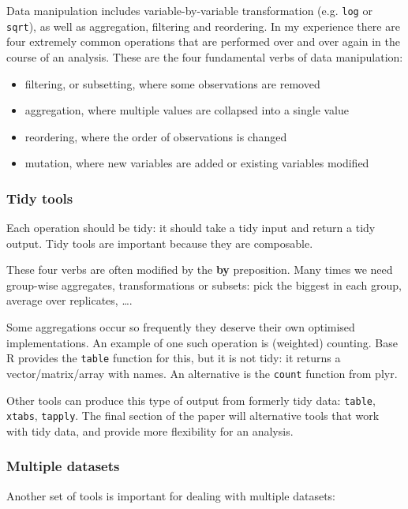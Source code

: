 \documentclass[oneside]{article}
\begin{document}
Data manipulation includes variable-by-variable transformation (e.g. {\tt log} or {\tt sqrt}), as well as aggregation, filtering and reordering. In my experience there are four extremely common operations that are performed over and over again in the course of an analysis. These are the four fundamental verbs of data manipulation:

\begin{itemize}

\item filtering, or subsetting, where some observations are removed
\item aggregation, where multiple values are collapsed into a single value
\item reordering, where the order of observations is changed
\item mutation, where new variables are added or existing variables modified 

\end{itemize}

\subsubsection{Tidy tools}

Each operation should be tidy: it should take a tidy input and return a tidy output. Tidy tools are important because they are composable.

These four verbs are often modified by the \textbf{by} preposition. Many times we need group-wise aggregates, transformations or subsets: pick the biggest in each group, average over replicates, \ldots.  

Some aggregations occur so frequently they deserve their own optimised implementations. An example of one such operation is (weighted) counting. Base R provides the {\tt table} function for this, but it is not tidy: it returns a vector/matrix/array with names. An alternative is the {\tt count} function from plyr.

Other tools can produce this type of output from formerly tidy data: {\tt table}, {\tt xtabs}, {\tt tapply}. The final section of the paper will alternative tools that work with tidy data, and provide more flexibility for an analysis.

\subsubsection{Multiple datasets}

Another set of tools is important for dealing with multiple datasets: 
\end{document}
